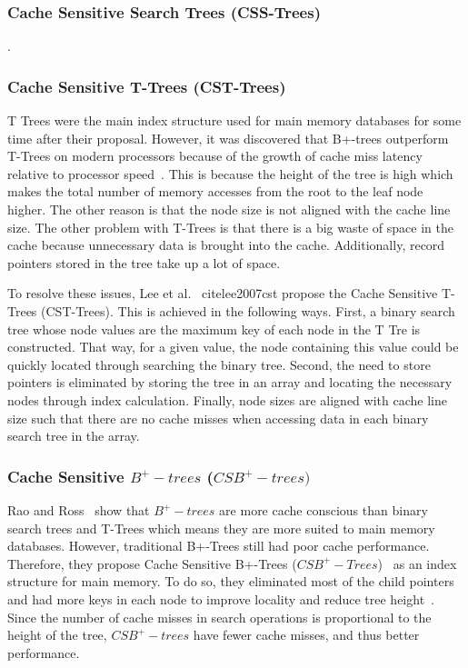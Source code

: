 \documentclass[12pt,a4paper]{article}
\begin{document}
\subsubsection*{Cache Sensitive Search Trees (CSS-Trees)}
\cite{rao1999cache}.


\subsubsection*{Cache Sensitive T-Trees (CST-Trees)}

T Trees were the main index structure used for main memory databases for some time after their proposal. However, it was discovered that B+-trees outperform T-Trees on modern processors because of the growth of cache miss latency relative to processor speed~\cite{rao1999cache,lee2007cst}. This is because the height of the tree is high which makes the total number of memory accesses from the root to the leaf node higher. The other reason is that the node size is not aligned with the cache line size. The other problem with T-Trees is that there is a big waste of space in the cache because unnecessary data is brought into the cache. Additionally, record pointers stored in the tree take up a lot of space.

To resolve these issues, Lee et al.~
cite{lee2007cst} propose the Cache Sensitive T-Trees (CST-Trees). This is achieved in the following ways. First, a binary search tree whose node values are the maximum key of each node in the T Tre is constructed. That way, for a given value, the node containing this value could be quickly located through searching the binary tree. Second, the need to store pointers is eliminated by storing the tree in an array and locating the necessary nodes through index calculation. Finally, node sizes are aligned with cache line size such that there are no cache misses when accessing data in each binary search tree in the array.

\subsubsection*{Cache Sensitive $B^{+}-trees$ ($CSB^{+}-trees)$}

Rao and Ross~\cite{rao1999cache} show that $B^{+}-trees$ are more cache conscious than binary search trees and T-Trees which means they are more suited to main memory databases. However, traditional B+-Trees still had poor cache performance. Therefore, they propose Cache Sensitive B+-Trees ($CSB^{+}-Trees$)~\cite{rao2000making} as an index structure for main memory. To do so, they eliminated most of the child pointers and had more keys in each node to improve locality and reduce tree height~\cite{luan2009prefetching}. Since the number of cache misses in search operations is proportional to the height of the tree, $CSB^{+}-trees$ have fewer cache misses, and thus better performance.
\end{document}

